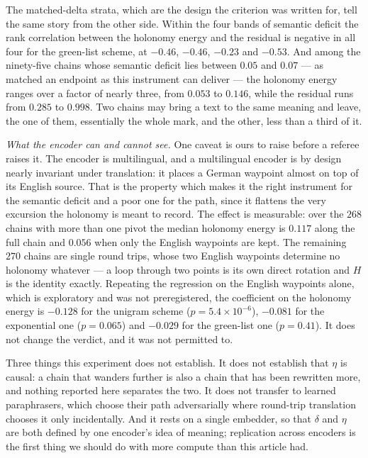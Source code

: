 \documentclass[11pt,a4paper]{article}
\theoremstyle{plain}
\theoremstyle{definition}
\numberwithin{equation}{section}
\begin{document}
The matched-delta strata, which are the design the criterion was written
for, tell the same story from the other side. Within the four bands of
semantic deficit the rank correlation between the holonomy energy and
the residual is negative in all four for the green-list scheme, at
$-0.46$, $-0.46$, $-0.23$ and $-0.53$. And among the ninety-five chains
whose semantic deficit lies between $0.05$ and $0.07$ --- as matched an
endpoint as this instrument can deliver --- the holonomy energy ranges
over a factor of nearly three, from $0.053$ to $0.146$, while the
residual runs from $0.285$ to $0.998$. Two chains may bring a text to
the same meaning and leave, the one of them, essentially the whole mark,
and the other, less than a third of it.

\medskip
\noindent\emph{What the encoder can and cannot see.}
One caveat is ours to raise before a referee raises it. The encoder is
multilingual, and a multilingual encoder is by design nearly invariant
under translation: it places a German waypoint almost on top of its
English source. That is the property which makes it the right instrument
for the semantic deficit and a poor one for the path, since it flattens
the very excursion the holonomy is meant to record. The effect is
measurable: over the $268$ chains with more than one pivot the median
holonomy energy is $0.117$ along the full chain and $0.056$ when only
the English waypoints are kept. The remaining $270$ chains are single
round trips, whose two English waypoints determine no holonomy whatever
--- a loop through two points is its own direct rotation and $H$ is the
identity exactly. Repeating the regression on the English waypoints
alone, which is exploratory and was not preregistered, the coefficient
on the holonomy energy is $-0.128$ for the unigram scheme
($p = 5.4\times10^{-6}$), $-0.081$ for the exponential one
($p = 0.065$) and $-0.029$ for the green-list one ($p = 0.41$). It does
not change the verdict, and it was not permitted to.

Three things this experiment does not establish. It does not establish
that $\eta$ is causal: a chain that wanders further is also a chain that
has been rewritten more, and nothing reported here separates the two. It
does not transfer to learned paraphrasers, which choose their path
adversarially where round-trip translation chooses it only
incidentally. And it rests on a single embedder, so that $\delta$ and
$\eta$ are both defined by one encoder's idea of meaning; replication
across encoders is the first thing we should do with more compute than
this article had.
\end{document}
